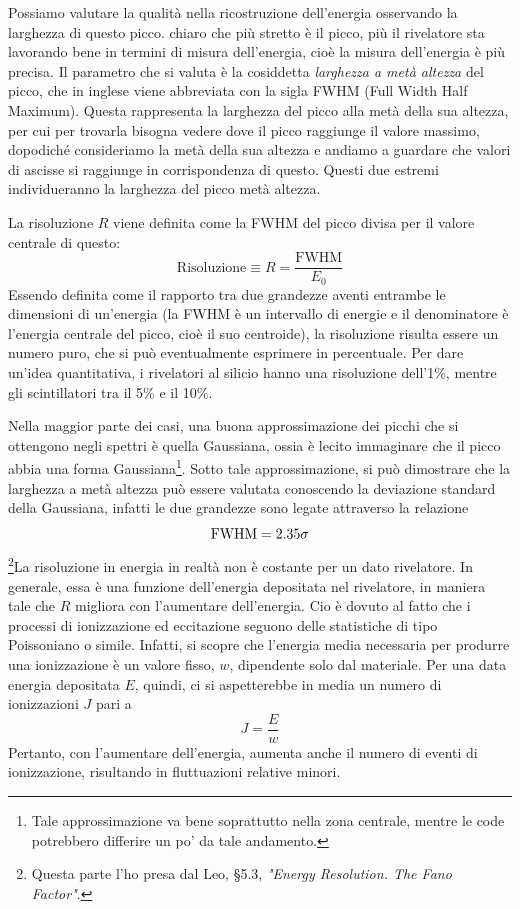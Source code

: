 Possiamo valutare la qualità nella ricostruzione dell'energia osservando la larghezza di questo picco. \E chiaro che più stretto è il picco, più il rivelatore sta lavorando bene in termini di misura dell'energia, cioè la misura dell'energia è più precisa. Il parametro che si valuta è la cosiddetta \textit{larghezza a metà altezza} del picco, che in inglese viene abbreviata con la sigla FWHM (Full Width Half Maximum). Questa rappresenta la larghezza del picco alla metà della sua altezza, per cui per trovarla bisogna vedere dove il picco raggiunge il valore massimo, dopodiché consideriamo la metà della sua altezza e andiamo a guardare che valori di ascisse si raggiunge in corrispondenza di questo. Questi due estremi individueranno la larghezza del picco metà altezza.

La risoluzione $R$ viene definita come la FWHM del picco divisa per il valore centrale di questo:
\begin{equation*}
   \text{Risoluzione}\equiv R=\frac{\text{FWHM}}{E_0}
\end{equation*}
Essendo definita come il rapporto tra due grandezze aventi entrambe le dimensioni di un'energia (la FWHM è un intervallo di energie e il denominatore è l'energia centrale del picco, cioè il suo centroide), la risoluzione risulta essere un numero puro, che si può eventualmente esprimere in percentuale. Per dare un'idea quantitativa, i rivelatori al silicio hanno una risoluzione dell'1\%, mentre gli scintillatori tra il 5\% e il 10\%.

Nella maggior parte dei casi, una buona approssimazione dei picchi che si ottengono negli spettri è quella Gaussiana, ossia è lecito immaginare che il picco abbia una forma Gaussiana\footnote{Tale approssimazione va bene soprattutto nella zona centrale, mentre le code potrebbero differire un po' da tale andamento.}. Sotto tale approssimazione, si può dimostrare che la larghezza a metà altezza può essere valutata conoscendo la deviazione standard della Gaussiana, infatti le due grandezze sono legate attraverso la relazione
\begin{equation*}
   \rm FWHM=2.35\sigma
\end{equation*}
\footnote{Questa parte l'ho presa dal Leo, \S5.3, \textit{"Energy Resolution. The Fano Factor"}.}La risoluzione in energia in realtà non è costante per un dato rivelatore. In generale, essa è una funzione dell'energia depositata nel rivelatore, in maniera tale che $R$ migliora con l'aumentare dell'energia. Cio è dovuto al fatto che i processi di ionizzazione ed eccitazione seguono delle statistiche di tipo Poissoniano o simile. Infatti, si scopre che l'energia media necessaria per produrre una ionizzazione è un valore fisso, $w$, dipendente solo dal materiale. Per una data energia depositata $E$, quindi, ci si aspetterebbe in media un numero di ionizzazioni $J$ pari a
\begin{equation*}
   J=\frac{E}{w} 
\end{equation*}
Pertanto, con l'aumentare dell'energia, aumenta anche il numero di eventi di ionizzazione, risultando in fluttuazioni relative minori.

